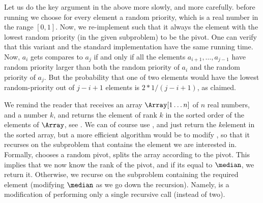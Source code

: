 \begin{remark}
    Let us do the key argument in the above more slowly, and more
    carefully.  before running \QuickSort{} we choose for
    every element a random priority, which is a real number in the
    range $[0,1]$. Now, we re-implement \QuickSort{} such that it
    always  the element with the lowest random priority (in the
    given subproblem) to be the pivot. One can verify that this
    variant and the standard implementation have the same running
    time. Now, $a_i$ gets compares to $a_j$ if and only if all the
    elements $a_{i+1}, \ldots, a_{j-1}$ have random priority larger
    than both the random priority of $a_i$ and the random priority of
    $a_j$. But the probability that one of two elements would have the
    lowest random-priority out of $j-i+1$ elements is $2 * 1/(j-i+1)$,
    as claimed.
\end{remark}





We remind the reader that \QuickSelect receives an array
$\Array[1\ldots n]$ of $n$ real numbers, and a number $k$, and returns the
element of rank $k$ in the sorted order of the elements of $\Array$, see
.  We can of course use \QuickSort, and just return
the $k$\th element in the sorted array, but a more efficient algorithm
would be to modify \QuickSelect, so that it recurses on the subproblem
that contains the element we are interested in. Formally, \QuickSelect
chooses a random pivot, splits the array according to the pivot. This
implies that we now know the rank of the pivot, and if its equal to
$\median$, we return it. Otherwise, we recurse on the subproblem
containing the required element (modifying $\median$ as we go down the
recursion).  Namely, \QuickSelect is a modification of \QuickSort
performing only a single recursive call (instead of two).


